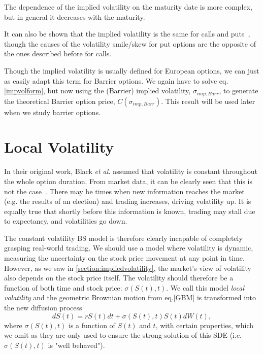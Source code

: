 The dependence of the implied volatility on the maturity date is more complex, but in general it decreases with the maturity.

It can also be shown that the implied volatility is the same for calls and puts~\citep{Hull}, though the causes of the volatility smile/skew for put options are the opposite of the ones described before for calls.

Though the implied volatility is usually defined for European options, we can just as easily adapt this term for Barrier options. We again have to solve eq.\eqref{impvolform}, but now using the (Barrier) implied volatility, $\sigma_{imp,Barr}$, to generate the theoretical Barrier option price, $C(\sigma_{imp,Barr})$. This result will be used later when we study barrier options.



\section{Local Volatility}
\label{section:localvolatility}
In their original work, Black \textit{et al.} assumed that volatility is constant throughout the whole option duration. From market data, it can be clearly seen that this is not the case~\citep{DJIA}. There may be times when new information reaches the market  (e.g. the results of an election) and trading increases, driving volatility up. It is equally true that shortly before this information is known, trading may stall due to expectancy, and volatilities go down. 

The constant volatility BS model is therefore clearly incapable of completely grasping real-world trading. We should use a model where volatility is dynamic, measuring the uncertainty on the stock price movement at any point in time.
However, as we saw in \autoref{section:impliedvolatility}, the market's view of volatility also depends on the stock price itself.
The volatility should therefore be a function of both time and stock price: $\sigma(S(t),t)$. We call this model \emph{local volatility} and the geometric Brownian motion from eq.\eqref{GBM} is transformed into the new diffusion process
\begin{equation}\label{GBM2}
dS(t)=rS(t)dt+\sigma(S(t),t)S(t)dW(t),
\end{equation}
\noindent where $\sigma(S(t),t)$ is a function of $S(t)$ and $t$, with certain properties, which we omit as they are only used to ensure the strong solution of this SDE (i.e. $\sigma(S(t),t)$ is "well behaved").


